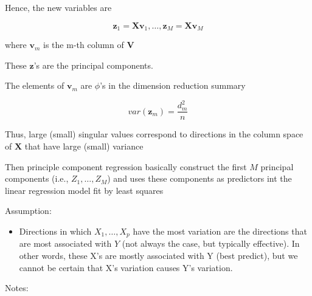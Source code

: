 \documentclass[
]{book}
\providecommand{\tightlist}{%
  \setlength{\itemsep}{0pt}\setlength{\parskip}{0pt}}
\begin{document}
Hence, the new variables are

\[
\mathbf{z}_1 = \mathbf{Xv}_1 , \dots, \mathbf{z}_M = \mathbf{Xv}_M
\]

where \(\mathbf{v}_m\) is the m-th column of \(\mathbf{V}\)

These \(\mathbf{z}\)'s are the principal components.

The elements of \(\mathbf{v}_m\) are \(\phi\)'s in the dimension reduction summary

\[
var(\mathbf{z}_m) = \frac{d^2_m}{n}
\]

Thus, large (small) singular values correspond to directions in the column space of \(\mathbf{X}\) that have large (small) variance

Then principle component regression basically construct the first \(M\) principal components (i.e., \(Z_1, \dots, Z_M\)) and uses these components as predictors int the linear regression model fit by least squares

Assumption:

\begin{itemize}
\tightlist
\item
  Directions in which \(X_1, \dots , X_p\) have the most variation are the directions that are most associated with \(Y\) (not always the case, but typically effective). In other words, these X's are mostly associated with Y (best predict), but we cannot be certain that X's variation causes Y's variation.
\end{itemize}

Notes:
\end{document}
